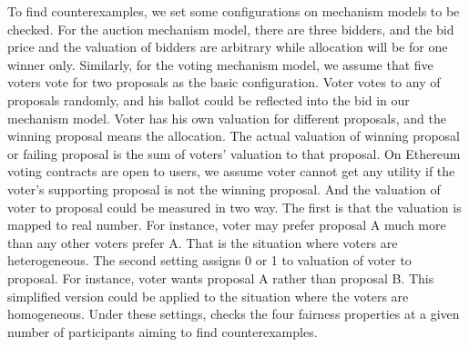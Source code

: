 To find counterexamples, we set some configurations on mechanism models to be checked. For the auction mechanism model, there are three bidders, and the bid price and the valuation of bidders are arbitrary while allocation will be for one winner only.
Similarly, for the voting mechanism model, we assume that five voters vote for two proposals as the
basic configuration.
Voter votes to any of proposals randomly, and his ballot could be reflected into the bid in our
mechanism model.
Voter has his own valuation for different proposals, and the winning proposal means the allocation. The actual valuation of winning proposal or failing proposal is the sum of voters' valuation to that proposal.
On Ethereum voting contracts are open to users, we assume voter cannot get any utility if the voter's supporting proposal is not the winning proposal. And the valuation of voter to proposal could be measured in two way.
The first is that the valuation is mapped to real number. For instance, voter may prefer proposal A
much more than any other voters prefer A. That is the situation where voters are heterogeneous.
The second setting assigns 0 or 1 to valuation of voter to proposal. For instance, voter wants
proposal A rather than proposal B. This simplified version could be applied to the situation where
the voters are homogeneous.
Under these settings, \faircon checks the four fairness properties at a given number of participants aiming to find counterexamples.

